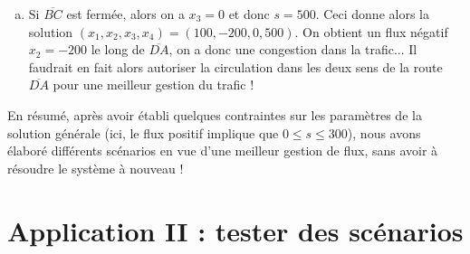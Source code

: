 \begin{myprob}
\begin{mysol}
\begin{enumerate}[(a)]
\item Si $\overline{BC}$ est fermée, alors on a $x_3=0$ et donc $s=500$. 
Ceci donne alors la solution $(x_1,x_2,x_3,x_4) = (100,-200,0,500)$. On obtient un flux négatif $x_2 = -200$ le long de $\overline{DA}$, on a donc une congestion dans la trafic... Il faudrait en fait alors
autoriser la circulation dans les deux sens de la route $\overline{DA}$ pour une meilleur gestion du trafic !
\end{enumerate}
En r\'esum\'e, après avoir établi quelques contraintes sur les paramètres de la solution générale (ici, le flux positif implique que $0\leq s\leq 300$), nous avons élaboré différents scénarios en vue d'une meilleur gestion de flux, sans avoir à résoudre le système à nouveau !
\end{mysol}\end{myprob}

\section{Application II : tester des scénarios}

